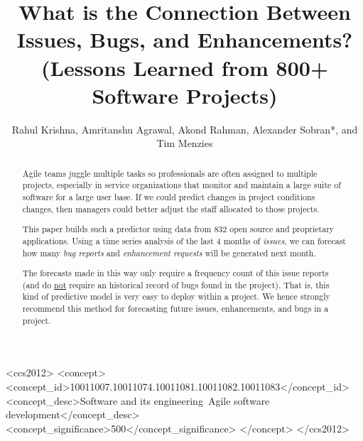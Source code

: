 \documentclass[sigconf, preprint]{acmart}
\begin{document}
\title{What is the Connection Between Issues, Bugs, and Enhancements?
(Lessons Learned
from
800+ Software Projects)}
\author{
Rahul Krishna, Amritanshu Agrawal, Akond Rahman, 
Alexander Sobran*, and Tim Menzies}






\begin{abstract}
Agile teams juggle multiple tasks so professionals are often assigned to multiple projects, especially in service organizations that monitor and maintain a large suite of software for a large user base. 
If we could predict changes in
project conditions
changes, then managers could  better adjust the
staff allocated to those projects.

This paper builds such a predictor using data from  832  open source and 
proprietary applications. 
Using a time series analysis of the   last 4 months
of {\em issues}, we can forecast how many {\em bug reports} and \textit{enhancement requests} will be generated  next month. 

The forecasts made in this way only require a frequency count of this issue reports 
(and do \underline{not} require an historical record of bugs found in the project). That is, this kind of predictive model is very easy to deploy within a project. We hence strongly recommend this method for forecasting future issues, enhancements, and bugs in a project. 
\end{abstract}




\begin{CCSXML}
<ccs2012>
<concept>
<concept_id>10011007.10011074.10011081.10011082.10011083</concept_id>
<concept_desc>Software and its engineering~Agile software 
development</concept_desc>
<concept_significance>500</concept_significance>
</concept>
</ccs2012>
\end{CCSXML}




\maketitle
\end{document}
